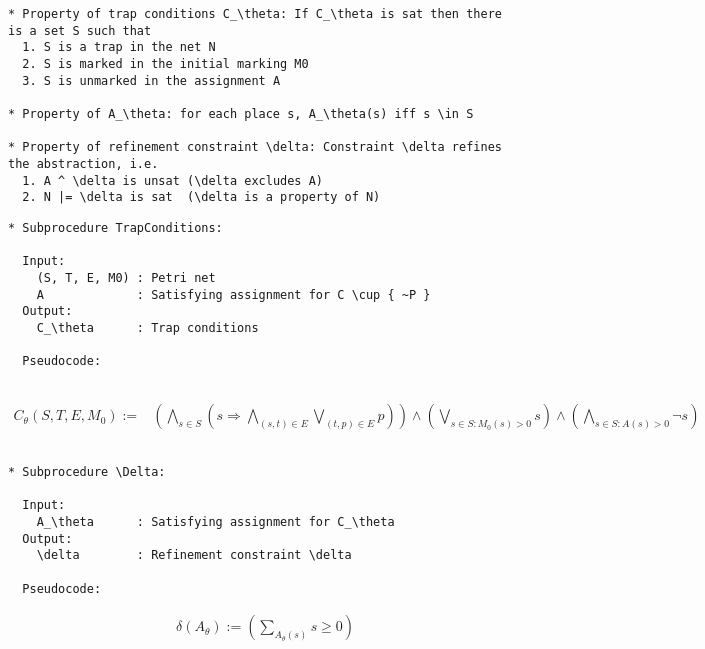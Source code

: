 \documentclass{llncs}
\begin{document}
\begin{verbatim}
* Property of trap conditions C_\theta: If C_\theta is sat then there is a set S such that
  1. S is a trap in the net N
  2. S is marked in the initial marking M0
  3. S is unmarked in the assignment A

* Property of A_\theta: for each place s, A_\theta(s) iff s \in S

* Property of refinement constraint \delta: Constraint \delta refines the abstraction, i.e.
  1. A ^ \delta is unsat (\delta excludes A)
  2. N |= \delta is sat  (\delta is a property of N)
\end{verbatim}

\newpage

\begin{verbatim}
* Subprocedure TrapConditions:

  Input:
    (S, T, E, M0) : Petri net
    A             : Satisfying assignment for C \cup { ~P }
  Output:
    C_\theta      : Trap conditions

  Pseudocode:
  
\end{verbatim}
\begin{align*}
  C_\theta(S, T, E, M_0) :=& \left( \bigwedge_{s \in S} \left( s \Rightarrow
      \bigwedge_{(s, t) \in E} \bigvee_{(t, p) \in E} p
    \right) \right) \land
    \left( \bigvee_{s \in S: M_0(s) > 0} s \right) \land
    \left( \bigwedge_{s \in S: A(s) > 0} \neg s \right)
\end{align*}
\begin{verbatim}

* Subprocedure \Delta:

  Input:
    A_\theta      : Satisfying assignment for C_\theta
  Output:
    \delta        : Refinement constraint \delta

  Pseudocode:

\end{verbatim}
\begin{align*}
  & \delta(A_\theta) := \left( \sum_{A_\theta(s)} s \ge 0 \right)
\end{align*}

\newpage
\end{document}

